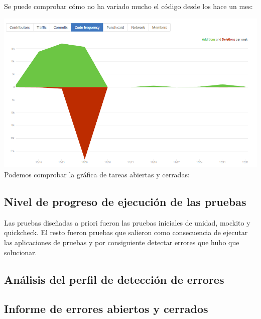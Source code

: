 \documentclass[DIV=calc,paper=a4,fontsize=11pt,onecolumn]{scrartcl} %
\begin{document}
  	Se puede comprobar cómo no ha variado mucho el código desde los hace un mes:
  	
  	\includegraphics[width=15cm]{Imagenes/frecuenciaCodigo.png} \\
  	
  	
  	Podemos comprobar la gráfica de tareas abiertas y cerradas:
  		
  	\subsection{Nivel de progreso de ejecución de las pruebas}
  	Las pruebas diseñadas a priori fueron las pruebas iniciales de unidad, mockito y quickcheck.
  	El resto fueron pruebas que salieron como consecuencia de ejecutar las aplicaciones de pruebas y por consiguiente detectar errores que hubo que solucionar.
  	\subsection{Análisis del perfil de detección de errores}
  	
  	\subsection{Informe de errores abiertos y cerrados}
\end{document}
